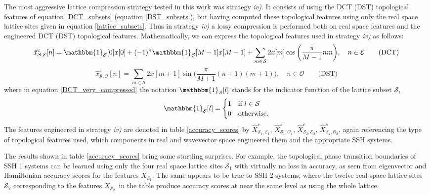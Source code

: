 \documentclass[10pt]{revtex4-1}
\newcommand{\indicator}[1]{\mathbbm{1}_{\mathcal{#1}}}
\newcommand\xSOne{$X_{\mathcal{S}_1}$}
\newcommand\xcSEOne{$\hat{X}^c_{\mathcal{S}_1,\mathcal{E}_1}$}
\newcommand\xsSOOne{$\hat{X}^s_{\mathcal{S}_1,\mathcal{O}_1}$}
\newcommand\xSTwo{$X_{\mathcal{S}_2}$}
\newcommand\xcSETwo{$\hat{X}^c_{\mathcal{S}_2,\mathcal{E}_2}$}
\newcommand\xsSOTwo{$\hat{X}^s_{\mathcal{S}_2,\mathcal{O}_2}$}
\begin{document}
The most aggressive lattice compression strategy tested in this work was strategy \emph{iv)}. It consists of using the DCT (DST) topological features of equation \eqref{DCT_subsets} (equation \eqref{DST_subsets}), but having computed these topological features using only the real space lattice sites given in equation \eqref{lattice_subsets}. Thus in strategy \emph{iv)} a lossy compression is performed both on real space features and the engineered DCT (DST) topological features. Mathematically, we can express the topological features used in strategy \emph{iv)} as follows:
\begin{equation}
\label{DCT_very_compressed}
\hat{x}_{\mathcal{S}, \mathcal{E}}^c[n] = \indicator{\mathcal{S}}[0]x[0] + (-1)^n\indicator{\mathcal{S}}[M-1] x[M-1] + \sum_{m \in \mathcal{S}} 2x[m]\cos\bigg(\frac{\pi}{M-1}nm\bigg), \quad n \in \mathcal{E} \qquad \text{(DCT)} 
\end{equation}
\begin{equation}
\label{DST_very_compressed}
\hat{x}_{\mathcal{S}, \mathcal{O}}^s[n] = \sum_{m \in \mathcal{S}}2x[m+1]\sin\bigg(\frac{\pi}{M+1}(n+1)(m+1)\bigg), \quad n \in \mathcal{O} \qquad \text{(DST)}
\end{equation}
where in equation \eqref{DCT_very_compressed} the notation $\mathbbm{1}_{\mathcal{S}}[l]$ stands for the indicator function of the lattice subset $\mathcal{S}$, 
\begin{equation}
\label{indicator_function}
\indicator{\mathcal{S}}[l] = \begin{cases}
      1 & \text{if } l \in \mathcal{S} \\
      0 & \text{otherwise}.
    \end{cases}
\end{equation}
The features engineered in strategy \emph{iv)} are denoted in table \ref{accuracy_scores} by \xcSEOne, \xsSOOne, \xcSETwo, \xsSOTwo, again referencing the type of topological features used, which components in real and wavevector space engineered them and the appropriate SSH systems. 

The results shown in table \ref{accuracy_scores} bring some startling surprises. For example, the topological phase transition boundaries of SSH 1 systems can be learned using only the four real space lattice sites $\mathcal{S}_1$ with virtually no loss in accuracy, as seen from eigenvector and Hamiltonian accuracy scores for the features \xSOne. The same appears to be true to SSH 2 systems, where the twelve real space lattice sites $\mathcal{S}_2$ corresponding to the features \xSTwo\ in the table produce accuracy scores at near the same level as using the whole lattice.    
\end{document}
